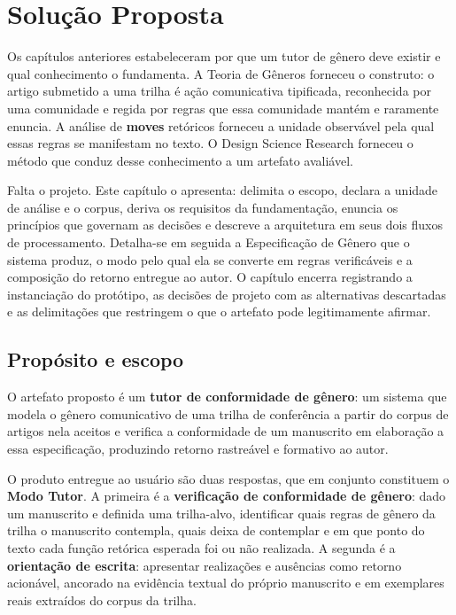 \chapter{Solução Proposta}
\label{chap:solucao}

Os capítulos anteriores estabeleceram por que um tutor de gênero deve existir e qual conhecimento o fundamenta. A Teoria de Gêneros \cite{GenresOrgComm, GenreRepertoire, GenreSystems} forneceu o construto: o artigo submetido a uma trilha é ação comunicativa tipificada, reconhecida por uma comunidade e regida por regras que essa comunidade mantém e raramente enuncia. A análise de \textbf{moves} retóricos \cite{GenreAnalysis, ResearchGenres} forneceu a unidade observável pela qual essas regras se manifestam no texto. O Design Science Research \cite{Hevner2004, Peffers2007} forneceu o método que conduz desse conhecimento a um artefato avaliável.

Falta o projeto. Este capítulo o apresenta: delimita o escopo, declara a unidade de análise e o corpus, deriva os requisitos da fundamentação, enuncia os princípios que governam as decisões e descreve a arquitetura em seus dois fluxos de processamento. Detalha-se em seguida a Especificação de Gênero que o sistema produz, o modo pelo qual ela se converte em regras verificáveis e a composição do retorno entregue ao autor. O capítulo encerra registrando a instanciação do protótipo, as decisões de projeto com as alternativas descartadas e as delimitações que restringem o que o artefato pode legitimamente afirmar.


\section{Propósito e escopo}
\label{sec:delimitacao}

O artefato proposto é um \textbf{tutor de conformidade de gênero}: um sistema que modela o gênero comunicativo de uma trilha de conferência a partir do corpus de artigos nela aceitos e verifica a conformidade de um manuscrito em elaboração a essa especificação, produzindo retorno rastreável e formativo ao autor.

O produto entregue ao usuário são duas respostas, que em conjunto constituem o \textbf{Modo Tutor}. A primeira é a \textbf{verificação de conformidade de gênero}: dado um manuscrito e definida uma trilha-alvo, identificar quais regras de gênero da trilha o manuscrito contempla, quais deixa de contemplar e em que ponto do texto cada função retórica esperada foi ou não realizada. A segunda é a \textbf{orientação de escrita}: apresentar realizações e ausências como retorno acionável, ancorado na evidência textual do próprio manuscrito e em exemplares reais extraídos do corpus da trilha.

